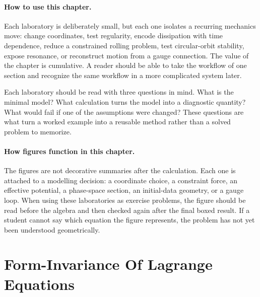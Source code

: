 \paragraph{How to use this chapter.}
Each laboratory is deliberately small, but each one isolates a recurring
mechanics move: change coordinates, test regularity, encode dissipation with
time dependence, reduce a constrained rolling problem, test circular-orbit
stability, expose resonance, or reconstruct motion from a gauge connection.
The value of the chapter is cumulative. A reader should be able to take the
workflow of one section and recognize the same workflow in a more complicated
system later.

Each laboratory should be read with three questions in mind. What is the
minimal model? What calculation turns the model into a diagnostic quantity?
What would fail if one of the assumptions were changed? These questions are
what turn a worked example into a reusable method rather than a solved problem
to memorize.

\paragraph{How figures function in this chapter.}
The figures are not decorative summaries after the calculation. Each one is
attached to a modelling decision: a coordinate choice, a constraint force, an
effective potential, a phase-space section, an initial-data geometry, or a
gauge loop. When using these laboratories as exercise problems, the figure
should be read before the algebra and then checked again after the final boxed
result. If a student cannot say which equation the figure represents, the
problem has not yet been understood geometrically.

\section{Form-Invariance Of Lagrange Equations}
\label{sec:lab-point-transformations}

